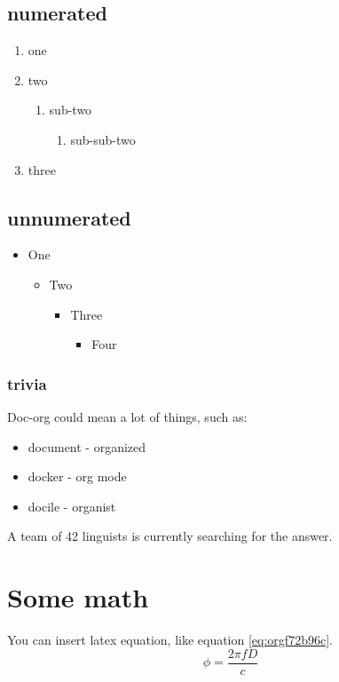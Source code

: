 \subsection{numerated}
\label{sec:org09a6586}
\begin{enumerate}
\item one
\item two
\begin{enumerate}
\item sub-two
\begin{enumerate}
\item sub-sub-two
\end{enumerate}
\end{enumerate}
\item three
\end{enumerate}

\subsection{unnumerated}
\label{sec:orgceb1719}
\begin{itemize}
\item One
\begin{itemize}
\item Two
\begin{itemize}
\item Three
\begin{itemize}
\item Four
\end{itemize}
\end{itemize}
\end{itemize}
\end{itemize}

\subsubsection{trivia}
\label{sec:orgce7aa40}
Doc-org could mean a lot of things, such as:
\begin{itemize}
\item document - organized
\item docker - org mode
\item docile - organist
\end{itemize}
A team of 42 linguists is currently searching for the answer.

\section{Some math}
\label{sec:orgafc2294}
You can insert latex equation, like equation \ref{eq:orgf72b96c}.
\begin{equation}
\label{eq:orgf72b96c}
\phi = \frac{2\pi fD}{c}
\end{equation}

